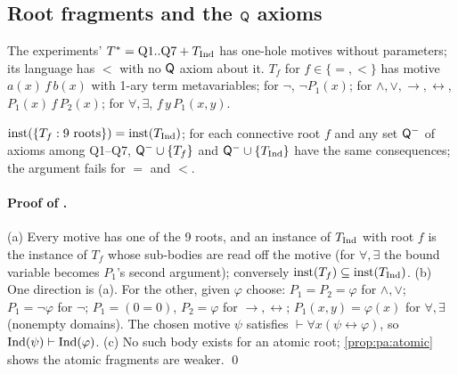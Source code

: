 \subsection{Root fragments and the \texorpdfstring{$\mathsf{Q}$}{Q} axioms}\label{app:pa:frag}

The experiments' $T^*=\mathrm{Q1..Q7}+T_{\mathrm{Ind}}$ has one-hole motives without parameters; its language has $<$ with no $\mathsf{Q}$ axiom about it. $T_f$ for $f\in\{=,<\}$ has motive $a(x)\,f\,b(x)$ with 1-ary term metavariables; for $\neg$, $\neg P_1(x)$; for $\wedge,\vee,\to,\leftrightarrow$, $P_1(x)\,f\,P_2(x)$; for $\forall,\exists$, $f\,y\,P_1(x,y)$.

\begin{proposition}\pabrk{}\label{prop:pa:fragments}
$\mathrm{inst}(\{T_f:\text{9 roots}\})=\mathrm{inst}(T_{\mathrm{Ind}})$; for each connective root $f$ and any set $\mathsf{Q}^-$ of axioms among Q1--Q7, $\mathsf{Q}^-\cup\{T_f\}$ and $\mathsf{Q}^-\cup\{T_{\mathrm{Ind}}\}$ have the same consequences; the argument fails for $=$ and $<$.
\end{proposition}

\paragraph{Proof of .} (a) Every motive has one of the 9 roots, and an instance of $T_{\mathrm{Ind}}$ with root $f$ is the instance of $T_f$ whose sub-bodies are read off the motive (for $\forall,\exists$ the bound variable becomes $P_1$'s second argument); conversely $\mathrm{inst}(T_f)\subseteq\mathrm{inst}(T_{\mathrm{Ind}})$. (b) One direction is (a). For the other, given $\varphi$ choose: $P_1=P_2=\varphi$ for $\wedge,\vee$; $P_1=\neg\varphi$ for $\neg$; $P_1=(0=0)$, $P_2=\varphi$ for $\to,\leftrightarrow$; $P_1(x,y)=\varphi(x)$ for $\forall,\exists$ (nonempty domains). The chosen motive $\psi$ satisfies $\vdash\forall x(\psi\leftrightarrow\varphi)$, so $\mathrm{Ind}(\psi)\vdash\mathrm{Ind}(\varphi)$. (c) No such body exists for an atomic root; \cref{prop:pa:atomic} shows the atomic fragments are weaker. \qed

